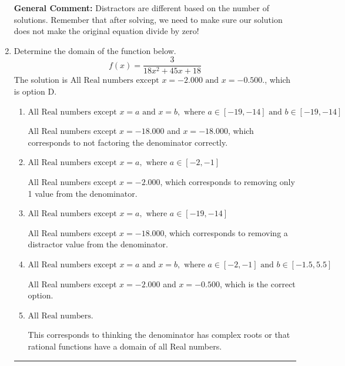\documentclass{extbook}[14pt]
\newcommand{\litem}[1]{\item #1

\rule{\textwidth}{0.4pt}}
\begin{document}
\begin{enumerate}
{\begin{enumerate}[label=\Alph*.]
\end{enumerate}

\textbf{General Comment:} Distractors are different based on the number of solutions. Remember that after solving, we need to make sure our solution does not make the original equation divide by zero!
}
\litem{
Determine the domain of the function below.
\[ f(x) = \frac{3}{18x^{2} +45 x + 18} \]The solution is \( \text{All Real numbers except } x = -2.000 \text{ and } x = -0.500. \), which is option D.\begin{enumerate}[label=\Alph*.]
\item \( \text{All Real numbers except } x = a \text{ and } x = b, \text{ where } a \in [-19, -14] \text{ and } b \in [-19, -14] \)

All Real numbers except $x = -18.000$ and $x = -18.000$, which corresponds to not factoring the denominator correctly.
\item \( \text{All Real numbers except } x = a, \text{ where } a \in [-2, -1] \)

All Real numbers except $x = -2.000$, which corresponds to removing only 1 value from the denominator.
\item \( \text{All Real numbers except } x = a, \text{ where } a \in [-19, -14] \)

All Real numbers except $x = -18.000$, which corresponds to removing a distractor value from the denominator.
\item \( \text{All Real numbers except } x = a \text{ and } x = b, \text{ where } a \in [-2, -1] \text{ and } b \in [-1.5, 5.5] \)

All Real numbers except $x = -2.000$ and $x = -0.500$, which is the correct option.
\item \( \text{All Real numbers.} \)

This corresponds to thinking the denominator has complex roots or that rational functions have a domain of all Real numbers.
\end{enumerate}

}
\end{enumerate}
\end{document}

